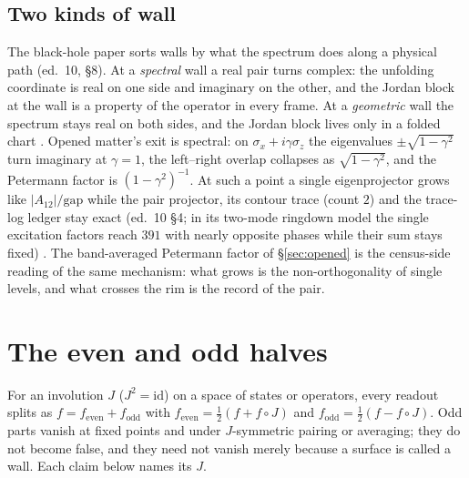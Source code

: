 \subsection{Two kinds of wall}
The black-hole paper sorts walls by what the spectrum does along a physical path (ed.~10, §8). At a \emph{spectral} wall a real pair turns complex: the unfolding coordinate is real on one side and imaginary on the other, and the Jordan block at the wall is a property of the operator in every frame. At a \emph{geometric} wall the spectrum stays real on both sides, and the Jordan block lives only in a folded chart . Opened matter's exit is spectral: on $\sigma_x+i\gamma\sigma_z$ the eigenvalues $\pm\sqrt{1-\gamma^2}$ turn imaginary at $\gamma=1$, the left–right overlap collapses as $\sqrt{1-\gamma^2}$, and the Petermann factor is $(1-\gamma^2)^{-1}$. At such a point a single eigenprojector grows like $|A_{12}|/\mathrm{gap}$ while the pair projector, its contour trace (count $2$) and the trace-log ledger stay exact (ed.~10 §4; in its two-mode ringdown model the single excitation factors reach $391$ with nearly opposite phases while their sum stays fixed) . The band-averaged Petermann factor of §\ref{sec:opened} is the census-side reading of the same mechanism: what grows is the non-orthogonality of single levels, and what crosses the rim is the record of the pair.

\section{The even and odd halves}\label{sec:parity}
For an involution $J$ ($J^2=\mathrm{id}$) on a space of states or operators, every readout splits as $f=f_{\mathrm{even}}+f_{\mathrm{odd}}$ with $f_{\mathrm{even}}=\tfrac12(f+f\circ J)$ and $f_{\mathrm{odd}}=\tfrac12(f-f\circ J)$. Odd parts vanish at fixed points and under $J$-symmetric pairing or averaging; they do not become false, and they need not vanish merely because a surface is called a wall. Each claim below names its $J$.

